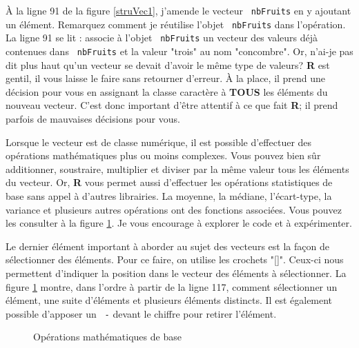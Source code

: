\documentclass[10.5pt,a4paper]{article}
\newcommand{\rcode}[1]{\texttt{\color{rstudio} #1}}
\begin{document}
    À la ligne 91 de la figure \ref{struVec1}, j'amende le vecteur \rcode{nbFruits} en y ajoutant un élément. Remarquez comment je réutilise l'objet \rcode{nbFruits} dans l'opération. La ligne 91 se lit : associe à l'objet \rcode{nbFruits} un vecteur des valeurs déjà contenues dans \rcode{nbFruits} et la valeur "trois" au nom "concombre". Or, n'ai-je pas dit plus haut qu'un vecteur se devait d'avoir le même type de valeurs? \textbf{R} est gentil, il vous laisse le faire sans retourner d'erreur. À la place, il prend une décision pour vous en assignant la classe caractère à \textbf{TOUS} les éléments du nouveau vecteur. C'est donc important d'être attentif à ce que fait \textbf{R}; il prend parfois de mauvaises décisions pour vous. 
    
    Lorsque le vecteur est de classe numérique, il est possible d'effectuer des opérations mathématiques plus ou moins complexes. Vous pouvez bien sûr additionner, soustraire, multiplier et diviser par la même valeur tous les éléments du vecteur. Or, \textbf{R} vous permet aussi d'effectuer les opérations statistiques de base sans appel à d'autres librairies. La moyenne, la médiane, l'écart-type, la variance et plusieurs autres opérations ont des fonctions associées. Vous pouvez les consulter à la figure \ref{struVec2}. Je vous encourage à explorer le code et à expérimenter. 
    
    Le dernier élément important à aborder au sujet des vecteurs est la façon de sélectionner des éléments. Pour ce faire, on utilise les crochets "[]". Ceux-ci nous permettent d'indiquer la position dans le vecteur des éléments à sélectionner. La figure \ref{struVec2} montre, dans l'ordre à partir de la ligne 117, comment sélectionner un élément, une suite d'éléments et plusieurs éléments distincts. Il est également possible d'apposer un \rcode{-} devant le chiffre pour retirer l'élément. 
    
    \begin{figure}[H]
    \centering
    \caption{Opérations mathématiques de base}
    \label{struVec2}
    \end{figure}
    
\end{document}
